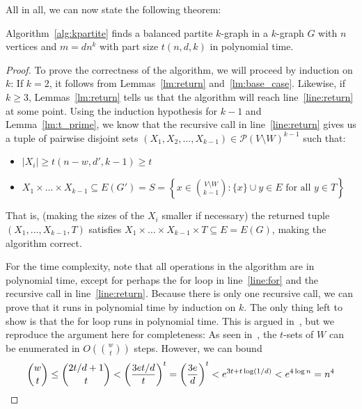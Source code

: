 All in all, we can now state the following theorem:

\begin{theorem}
    Algorithm~\ref{alg:kpartite} finds a balanced partite $k$-graph in a $k$-graph $G$ with
    $n$ vertices and $m = d n^k$ with part size $t(n, d, k)$ in polynomial time.
    \begin{proof}
        To prove the correctness of the algorithm, we will proceed by induction on $k$:
        If $k=2$, it follows from Lemmas~\ref{lm:return} and~\ref{lm:base_case}.
        Likewise, if $k \geq 3$, Lemmas~\ref{lm:return} tells us that the algorithm will
        reach line~\ref{line:return} at some point.
        Using the induction hypothesis for $k-1$ and Lemma~\ref{lm:t_prime},
        we know that the recursive call in line~\ref{line:return}
        gives us a tuple of pairwise disjoint sets
        $(X_1, X_2, \ldots, X_{k-1}) \in \mathcal{P}(V \setminus W)^{k-1}$ such that:
        \begin{itemize}
            \item $|X_i| \geq t(n-w, d', k-1) \geq t$

            \item $X_1 \times \dots \times X_{k-1} \subseteq E(G') = S =
            \left\{x \in \binom{V \setminus W}{k-1} : \{x\} \cup y \in E \text{ for all } y \in T\right\}$
        \end{itemize}

        That is, (making the sizes of the $X_i$ smaller if necessary) the returned tuple $(X_1, \dots, X_{k-1}, T)$
        satisfies $X_1 \times \dots \times X_{k-1} \times T \subseteq E = E(G)$, making the algorithm correct.

        For the time complexity, note that all operations in the algorithm are in polynomial time, %
        except for perhaps the for loop in line~\ref{line:for} and the recursive call in line~\ref{line:return}.
        Because there is only one recursive call, we can prove that it runs in polynomial time
        by induction on $k$.
        The only thing left to show is that the for loop runs in polynomial time.
        This is argued in~\cite{MUBAYI2010174}, but we reproduce the argument here for completeness:
        As seen in~\cite{reingold1977combinatorial}, the $t$-sets of $W$ can be enumerated in
        $O\left( \binom{w}{t} \right)$ steps.
        However, we can bound
        \[
            \binom{w}{t} \leq
            \binom{2t/d + 1}{t} <
            \left( \frac{3et/d}{t} \right)^{t} =
            \left( \frac{3e}{d} \right)^{t} <
            e^{3 t + t \log (1/d)} <
            e^{4 \log n} = n^4 \qedhere
        \]

    \end{proof}
\end{theorem}





